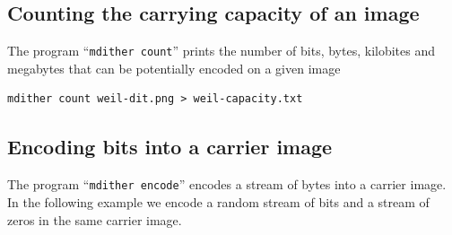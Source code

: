 \subsection{Counting the carrying capacity of an image}

The program ``\verb+mdither count+'' prints the number of bits, bytes, kilobites
and megabytes that can be potentially encoded on a given image

\begin{verbatim}
mdither count weil-dit.png > weil-capacity.txt
\end{verbatim}

\subsection{Encoding bits into a carrier image}

The program ``\verb+mdither encode+'' encodes a stream of bytes into a
carrier image.  In the following example we encode a random stream of bits
and a stream of zeros in the same carrier image.

